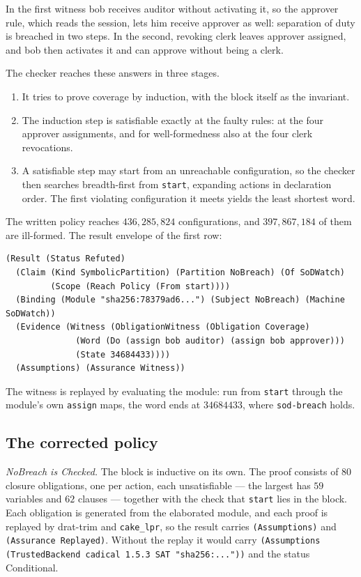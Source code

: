 \documentclass[11pt]{article}
\newcommand{\code}[1]{\texttt{#1}}
\theoremstyle{definition}
\theoremstyle{plain}
\begin{document}
In the first witness bob receives auditor without activating it, so the approver rule, which
reads the session, lets him receive approver as well: separation of duty is breached in two
steps. In the second, revoking clerk leaves approver assigned, and bob then activates it and can
approve without being a clerk.

The checker reaches these answers in three stages.
\begin{enumerate}
\item It tries to prove coverage by induction, with the block itself as the invariant.
\item The induction step is satisfiable exactly at the faulty rules: at the four approver
assignments, and for well-formedness also at the four clerk revocations.
\item A satisfiable step may start from an unreachable configuration, so the checker then searches
breadth-first from \code{start}, expanding actions in declaration order. The first violating
configuration it meets yields the least shortest word.
\end{enumerate}
The written policy reaches $436{,}285{,}824$ configurations, and $397{,}867{,}184$ of them are
ill-formed. The result envelope of the first row:
\begin{lstlisting}
(Result (Status Refuted)
  (Claim (Kind SymbolicPartition) (Partition NoBreach) (Of SoDWatch)
         (Scope (Reach Policy (From start))))
  (Binding (Module "sha256:78379ad6...") (Subject NoBreach) (Machine SoDWatch))
  (Evidence (Witness (ObligationWitness (Obligation Coverage)
              (Word (Do (assign bob auditor) (assign bob approver)))
              (State 34684433))))
  (Assumptions) (Assurance Witness))
\end{lstlisting}
The witness is replayed by evaluating the module: run from \code{start} through the module's own
\code{assign} maps, the word ends at $34684433$, where \code{sod-breach} holds.

\subsection{The corrected policy}

\emph{NoBreach is Checked.} The block is inductive on its own. The proof consists of $80$ closure
obligations, one per action, each unsatisfiable --- the largest has $59$ variables and $62$ clauses
--- together with the check that \code{start} lies in the block. Each obligation is generated from
the elaborated module, and each proof is replayed by drat-trim and \code{cake\_lpr}, so the result
carries \code{(Assumptions)} and \code{(Assurance Replayed)}. Without the replay it would carry
\code{(Assumptions (TrustedBackend cadical 1.5.3 SAT "sha256:..."))} and the status Conditional.
\end{document}

